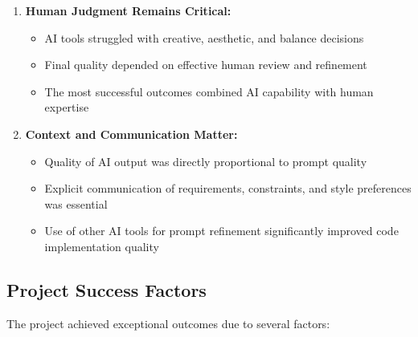 \documentclass[12pt,a4paper]{article}
\begin{document}
\begin{enumerate}
    \item \textbf{Human Judgment Remains Critical:}
    \begin{itemize}
        \item AI tools struggled with creative, aesthetic, and balance decisions
        \item Final quality depended on effective human review and refinement
        \item The most successful outcomes combined AI capability with human expertise
    \end{itemize}
    
    \item \textbf{Context and Communication Matter:}
    \begin{itemize}
        \item Quality of AI output was directly proportional to prompt quality
        \item Explicit communication of requirements, constraints, and style preferences was essential
        \item Use of other AI tools for prompt refinement significantly improved code implementation quality
    \end{itemize}
\end{enumerate}

\subsection{Project Success Factors}

The project achieved exceptional outcomes due to several factors:
\end{document}
